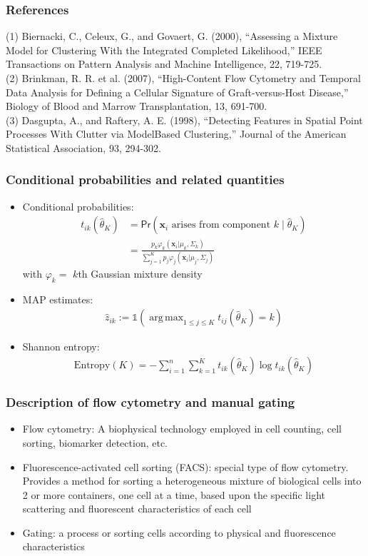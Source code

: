 \documentclass[mathserif,compress]{beamer}
\newcommand*\ba{\[ \begin{aligned}}
\newcommand*\ea{\end{aligned} \]}
\newcommand*\ind[1]{\mathbb{1}\left(#1\right)}
\newcommand*\estim[1]{\widehat{#1}}
\DeclareMathOperator*{\argmax}{arg\;max}
\renewcommand\;{\,}
\renewcommand\phi{\varphi}
\renewcommand\Pr[1]{ \mathsf{Pr}\left(#1\right) }
\newcommand{\bx}{\mathbf{x}}
\begin{document}
\begin{frame}\frametitle{References}
(1)
Biernacki, C., Celeux, G., and Govaert, G. (2000), ``Assessing a Mixture Model for Clustering With the Integrated
Completed Likelihood,'' IEEE Transactions on Pattern Analysis and Machine Intelligence, 22, 719-725.
\\ \bigskip
(2) Brinkman, R. R. et al. (2007), ``High-Content Flow Cytometry and Temporal Data Analysis for Defining a Cellular Signature of
Graft-versus-Host Disease,'' Biology of Blood and Marrow Transplantation, 13, 691-700.
\\ \bigskip
(3) Dasgupta, A., and Raftery, A. E. (1998), ``Detecting Features in Spatial Point Processes With Clutter via ModelBased
Clustering,'' Journal of the American Statistical Association, 93, 294-302. 
\end{frame}

\begin{frame}\frametitle{Conditional probabilities and related quantities}
\begin{itemize}
\item[]
Conditional probabilities:
\ba
t_{ik}(\estim\theta_K) & = \Pr{\bx_i \text{ arises from component $k$} \mid \estim\theta_K } \\
	& = \frac{ p_k \phi_k(\bx_i | \mu_k, \Sigma_k)  }
 	{ \sum_{j=1}^K p_j \phi_j(\bx_i | \mu_j, \Sigma_j) }
\ea
with $\phi_k = $ $k$th Gaussian mixture density
\medskip
\item[]
MAP estimates:
\ba
\estim z_{ik} := \ind{ \argmax_{1 \le j \le K} t_{ij}(\estim\theta_K) = k }
\ea
\item[]
Shannon entropy:
\ba
\text{Entropy}(K) = - \sum_{i=1}^n \sum_{k=1}^K
	t_{ik}(\estim\theta_K) \log t_{ik}(\estim\theta_K)
\ea
\end{itemize}
\end{frame}

\begin{frame}\frametitle{Description of flow cytometry and manual gating}
\begin{itemize}
\item
Flow cytometry:
A biophysical technology employed in cell counting, cell sorting, biomarker detection, etc.
\medskip
\item
Fluorescence-activated cell sorting (FACS): special type of flow cytometry. Provides a method for sorting a heterogeneous mixture of biological cells into 2 or more containers, one cell at a time, based upon the specific light scattering and fluorescent characteristics of each cell
\medskip
\item
Gating: a process or sorting cells according to physical and fluorescence characteristics
\end{itemize}
\end{frame}
\end{document}
